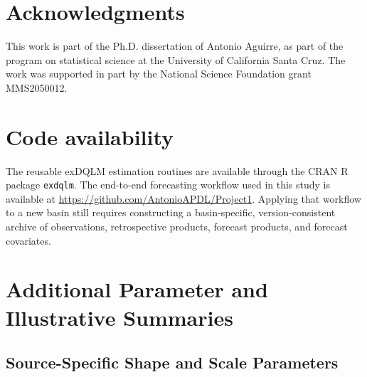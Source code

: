 \documentclass[APA,STIX1COL]{WileyNJD-v2}
\begin{document}
\section*{Acknowledgments}

This work is part of the Ph.D. dissertation of Antonio Aguirre, as part of 
the program on statistical science at the University of
California Santa Cruz. The work was supported in part by the National Science
Foundation grant MMS2050012.

\section*{Code availability}

The reusable exDQLM estimation routines are available through the CRAN R package \texttt{exdqlm}. The end-to-end forecasting workflow used in this study is available at \url{https://github.com/AntonioAPDL/Project1}. Applying that workflow to a new basin still requires constructing a basin-specific, version-consistent archive of observations, retrospective products, forecast products, and forecast covariates.






\clearpage


\appendix

\section{Additional Parameter and Illustrative Summaries}
\label{app:extras}

\subsection{Source-Specific Shape and Scale Parameters}
\label{app:sourceparams}
\end{document}

